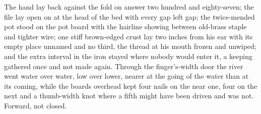 The hand lay back against the fold on answer two hundred and eighty-seven; the file lay open on  at the head of the bed with every gap left gap; the twice-mended pot stood on the pot board with the hairline showing between old-brass staple and tighter wire; one stiff brown-edged crust lay two inches from his ear with its empty place unnamed and no third, the thread at his mouth frozen and unwiped; and the extra interval in the iron stayed where nobody would enter it, a keeping gathered once and not made again. Through the finger's-width door the river went water over water, low over lower, nearer at the going of the water than at its coming, while the boards overhead kept four nails on the near one, four on the next and a thumb-width knot where a fifth might have been driven and was not. Forward, not closed.
